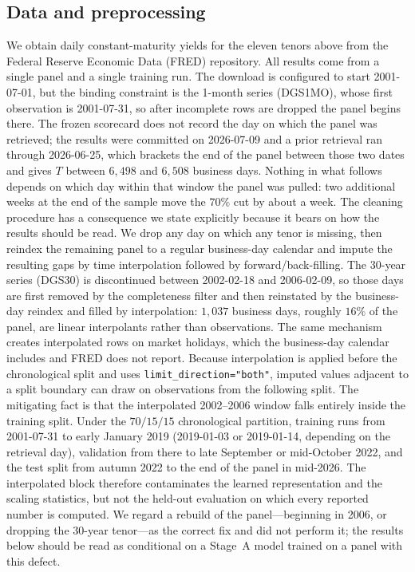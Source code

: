 \documentclass{article} %
\begin{document}
\subsection{Data and preprocessing}
\label{sec:data}
We obtain daily constant-maturity yields for the eleven tenors above from the
Federal Reserve Economic Data (FRED) repository. All results come from a single
panel and a single training run. The download is configured to start 2001-07-01, but
the binding constraint is the 1-month series (DGS1MO), whose first observation is
2001-07-31, so after incomplete rows are dropped the panel begins there. The frozen
scorecard does not record the day on which the panel was retrieved; the results were
committed on 2026-07-09 and a prior retrieval ran through 2026-06-25, which brackets
the end of the panel between those two dates and gives $T$ between $6{,}498$ and
$6{,}508$ business days. Nothing in what follows depends on which day within that
window the panel was pulled: two additional weeks at the end of the sample move the
$70\%$ cut by about a week.
The cleaning procedure has a consequence we state explicitly because it bears on how
the results should be read. We drop any day on which any tenor is missing, then
reindex the remaining panel to a regular business-day calendar and impute the
resulting gaps by time interpolation followed by forward/back-filling. The 30-year
series (DGS30) is discontinued between 2002-02-18 and 2006-02-09, so those days are
first removed by the completeness filter and then reinstated by the business-day
reindex and filled by interpolation: $1{,}037$ business days, roughly $16\%$ of the
panel, are linear interpolants rather than observations. The same mechanism creates
interpolated rows on market holidays, which the business-day calendar includes and
FRED does not report. Because interpolation is applied before the chronological
split and uses \texttt{limit\_direction="both"}, imputed values adjacent to a split
boundary can draw on observations from the following split.
The mitigating fact is that the interpolated 2002--2006 window falls entirely inside
the training split. Under the $70/15/15$ chronological partition, training runs from
2001-07-31 to early January 2019 (2019-01-03 or 2019-01-14, depending on the
retrieval day), validation from there to late September or mid-October 2022, and the
test split from autumn 2022 to the end of the panel in mid-2026. The interpolated
block therefore contaminates the learned representation and the scaling statistics,
but not the held-out evaluation on which every reported number is computed. We regard
a rebuild of the panel---beginning in 2006, or dropping the 30-year tenor---as the
correct fix and did not perform it; the results below should be read as conditional
on a Stage~A model trained on a panel with this defect.
\end{document}
